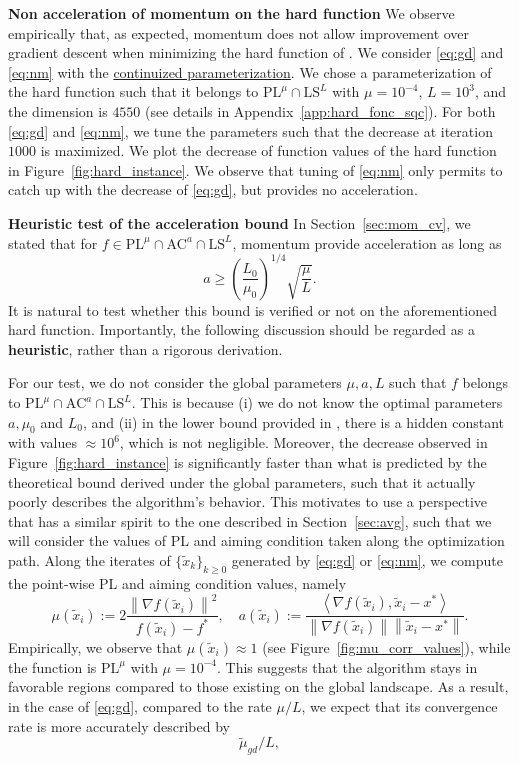 \documentclass{article}
\def\xdisc{\{\tilde x_k \}_{k\ge 0}}
\def\pl{{\text{PL}^\mu}}
\newcommand{\bpar}[1]{\left(#1\right)}
\newcommand{\norm}[1]{\left\lVert#1\right\rVert}
\newcommand{\dotprod}[1]{\left< #1\right>}
\newcommand{\ls}{\text{LS}^{L}}
\newcommand{\ac}{\text{AC}^{a}}
\theoremstyle{plain}
\theoremstyle{definition}
\theoremstyle{remark}
\begin{document}
\textbf{Non acceleration of momentum on the hard function \:}
We observe empirically that, as expected, momentum does not allow improvement over gradient descent when minimizing the hard function of \cite{PLlowerbound}. We consider \eqref{eq:gd} and \eqref{eq:nm} with the \hyperlink{cont_param}{continuized parameterization}. We chose a parameterization of the hard function such that it belongs to $\pl \cap \ls$ with $\mu=10^{-4}$, $L = 10^3$, and the dimension is $4550$ (see details in Appendix~\ref{app:hard_fonc_sqc}). For both \eqref{eq:gd} and \eqref{eq:nm}, we tune the parameters such that the decrease at iteration $1000$ is maximized. We plot the decrease of function values of the hard function in Figure~\ref{fig:hard_instance}. We observe that tuning of \eqref{eq:nm} only permits to catch up with the decrease of \eqref{eq:gd}, but provides no acceleration. 

\textbf{Heuristic test of the acceleration bound \:}
In Section~\ref{sec:mom_cv}, we stated that for $f \in \pl \cap \ac \cap \ls$, momentum provide acceleration as long as 
\[a \ge \bpar{\frac{L_0}{\mu_0}}^{1/4}\sqrt{\frac{\mu}{L}}.\]
It is natural to test whether this bound is verified or not on the aforementioned hard function. Importantly, the following discussion should be regarded as a \textbf{heuristic}, rather than a rigorous derivation.

For our test, we do not consider the global parameters $\mu, a ,L$ such that $f$ belongs to $\pl \cap \ac \cap \ls$. This is because (i) we do not know the optimal parameters $a, \mu_0$ and $L_0$, and (ii) in the lower bound provided in \cite{PLlowerbound}, there is a hidden constant with values $\approx 10^6$, which is not negligible. Moreover, the decrease observed in Figure~\ref{fig:hard_instance} is significantly faster than what is predicted by the theoretical bound derived under the global parameters, such that it actually poorly describes the algorithm's behavior. This motivates to use a perspective that has a similar spirit to the one described in Section~\ref{sec:avg}, such that we will consider the values of PL and aiming condition taken along the optimization path. Along the iterates of $\xdisc$ generated by \eqref{eq:gd} or \eqref{eq:nm}, we compute the point-wise PL and aiming condition values, namely
\[\mu(\tilde x_i) :=  2\frac{\norm{\nabla f(\tilde x_i)}^2}{f(\tilde x_i)-f^\ast}, \quad a(\tilde x_i) := \frac{\dotprod{\nabla f(\tilde x_i),\tilde x_i-x^\ast}}{\norm{\nabla f(\tilde x_i)}\norm{\tilde x_i-x^\ast}}.\] Empirically, we observe that $\mu(\tilde x_i) \approx 1$ (see Figure~\ref{fig:mu_corr_values}), while the function is $\pl$ with $\mu = 10^{-4}$. This suggests that the algorithm stays in favorable regions compared to those existing on the global landscape. As a result, in the case of \eqref{eq:gd}, compared to the rate $\mu/L$, we expect that its convergence rate is more accurately described by 
\[\tilde \mu_{gd}/L,\]
\end{document}
